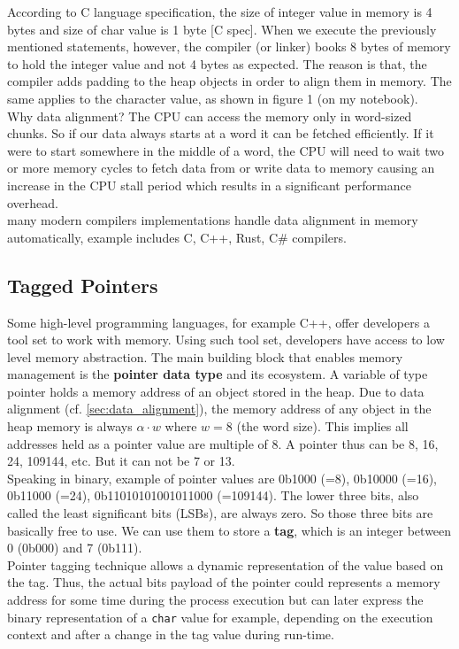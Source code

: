 According to C language specification, the size of integer value in memory is 4 bytes and size of char value is 1 byte [C spec]. When we execute the previously mentioned statements, however, the compiler (or linker) books 8 bytes of memory to hold the integer value and not 4 bytes as expected. The reason is that, the compiler adds padding to the heap objects in order to align them in memory. The same applies to the character value, as shown in figure 1 (on my notebook).  \\

Why data alignment? The CPU can access the memory only in word-sized chunks. So if our data always starts at a word it can be fetched efficiently. If it were to start somewhere in the middle of a word, the CPU will need to wait two or more memory cycles to fetch data from or write data to memory causing an increase in the CPU stall period which results in a significant performance overhead. \\


many modern compilers implementations handle data alignment in memory automatically, example includes C, C++, Rust, C\# compilers.

\subsection{Tagged Pointers}
Some high-level programming languages, for example C++, offer developers a tool set to work with memory. Using such tool set, developers have access to low level memory abstraction. The main building block that enables memory management is the \textbf{pointer data type} and its ecosystem. A variable of type pointer holds a memory address of an object stored in the heap. Due to data alignment (cf. \ref{sec:data_alignment}), the memory address of any object in the heap memory is always $\alpha\cdot w$ where $w=8$ (the word size). This implies all addresses held as a pointer value are multiple of 8. A pointer thus can be 8, 16, 24, 109144, etc. But it can not be 7 or 13. \\

Speaking in binary, example of pointer values are 0b1000 (=8), 0b10000 (=16), 0b11000 (=24), 0b11010101001011000 (=109144). The lower three bits, also called the least significant bits (LSBs), are always zero. So those three bits are basically free to use. We can use them to store a \textbf{tag}, which is an integer between 0 (0b000) and 7 (0b111).  \\ 

Pointer tagging technique allows a dynamic representation of the value based on the tag. Thus, the actual bits payload of the pointer could represents a memory address for some time during the process execution but can later express the binary representation of a \texttt{char} value for example, depending on the execution context and after a change in the tag value during run-time. \\

